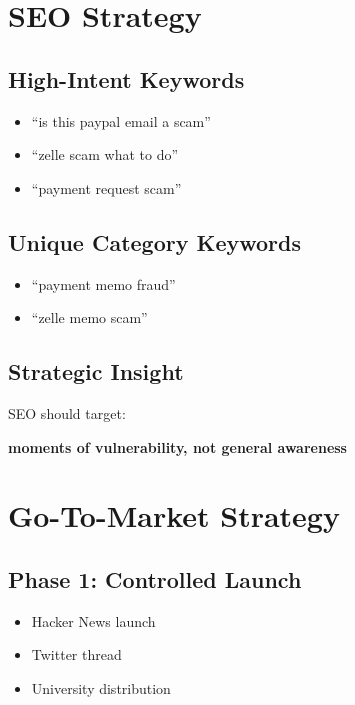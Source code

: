 \documentclass[11pt]{article}
\begin{document}
\section{SEO Strategy}

\subsection{High-Intent Keywords}

\begin{itemize}
    \item ``is this paypal email a scam''
    \item ``zelle scam what to do''
    \item ``payment request scam''
\end{itemize}

\subsection{Unique Category Keywords}

\begin{itemize}
    \item ``payment memo fraud''
    \item ``zelle memo scam''
\end{itemize}

\subsection{Strategic Insight}

SEO should target:
\begin{center}
\textbf{moments of vulnerability, not general awareness}
\end{center}

\section{Go-To-Market Strategy}

\subsection{Phase 1: Controlled Launch}
\begin{itemize}
    \item Hacker News launch
    \item Twitter thread
    \item University distribution
\end{itemize}
\end{document}
